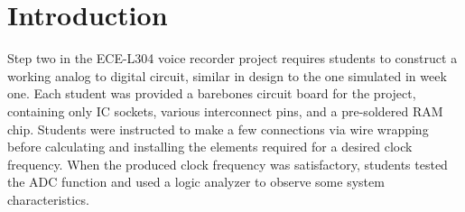 \section{Introduction}
Step two in the ECE-L304 voice recorder project requires students to construct
a working analog to digital circuit, similar in design to the one simulated in
week one.  Each student was provided a barebones circuit board for the project,
containing only IC sockets, various interconnect pins, and a pre-soldered RAM
chip.  Students were instructed to make a few connections via wire wrapping
before calculating and installing the elements required for a desired clock
frequency.  When the produced clock frequency was satisfactory, students tested
the ADC function and used a logic analyzer to observe some system
characteristics.
